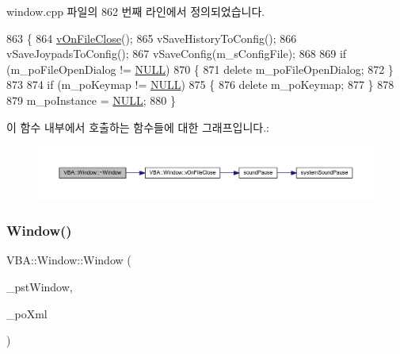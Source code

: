window.\+cpp 파일의 862 번째 라인에서 정의되었습니다.


\begin{DoxyCode}
863 \{
864   \mbox{\hyperlink{class_v_b_a_1_1_window_a9bb969481b9cfea3b5b5bc157ccc0ff6}{vOnFileClose}}();
865   vSaveHistoryToConfig();
866   vSaveJoypadsToConfig();
867   vSaveConfig(m\_sConfigFile);
868 
869   \textcolor{keywordflow}{if} (m\_poFileOpenDialog != \mbox{\hyperlink{getopt1_8c_a070d2ce7b6bb7e5c05602aa8c308d0c4}{NULL}})
870   \{
871     \textcolor{keyword}{delete} m\_poFileOpenDialog;
872   \}
873 
874   \textcolor{keywordflow}{if} (m\_poKeymap != \mbox{\hyperlink{getopt1_8c_a070d2ce7b6bb7e5c05602aa8c308d0c4}{NULL}})
875   \{
876     \textcolor{keyword}{delete} m\_poKeymap;
877   \}
878 
879   m\_poInstance = \mbox{\hyperlink{getopt1_8c_a070d2ce7b6bb7e5c05602aa8c308d0c4}{NULL}};
880 \}
\end{DoxyCode}
이 함수 내부에서 호출하는 함수들에 대한 그래프입니다.\+:
\nopagebreak
\begin{figure}[H]
\begin{center}
\leavevmode
\includegraphics[width=350pt]{class_v_b_a_1_1_window_a3bf5880da605d1190d685a4f7796ca51_cgraph}
\end{center}
\end{figure}
\mbox{\label{class_v_b_a_1_1_window_a747763400ba237d06f6e01577998f6ab}} 
\subsubsection{\texorpdfstring{Window()}{Window()}}
{\footnotesize\ttfamily V\+B\+A\+::\+Window\+::\+Window (\begin{DoxyParamCaption}\item[{Gtk\+Window $\ast$}]{\+\_\+pst\+Window,  }\item[{\mbox{\hyperlink{getopt1_8c_a2c212835823e3c54a8ab6d95c652660e}{const}} Glib\+::\+Ref\+Ptr$<$ Gnome\+::\+Glade\+::\+Xml $>$ \&}]{\+\_\+po\+Xml }\end{DoxyParamCaption})\hspace{0.3cm}{\ttfamily [protected]}}



